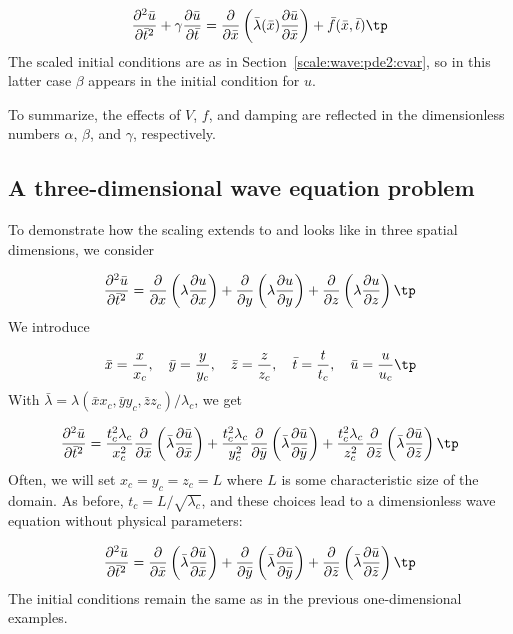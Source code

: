 \documentclass[graybox,envcountchap,sectrefs,final]{svmonodo}
\begin{document}
\begin{equation}
\frac{\partial^2 \bar u}{\partial \bar t^2}
+ \gamma\frac{\partial \bar u}{\partial \bar t} =
\frac{\partial}{\partial \bar x}\left(
\bar \lambda(\bar x) {\partial\bar u\over\partial\bar x}\right) +
\bar f(\bar x,\bar t)\tp
\end{equation}
The scaled initial conditions are as in
Section~\ref{scale:wave:pde2:cvar}, so in this latter case
$\beta$ appears in the initial condition for $u$.

To summarize, the effects of $V$, $f$, and damping are reflected in
the dimensionless numbers $\alpha$, $\beta$, and $\gamma$,
respectively.

\subsection{A three-dimensional wave equation problem}

To demonstrate how the scaling extends to and looks like in
three spatial dimensions, we consider

\begin{equation}
\frac{\partial^2 \bar u}{\partial \bar t^2} =
\frac{\partial}{\partial x}\left(\lambda\frac{\partial u}{\partial x}\right)+
\frac{\partial}{\partial y}\left(\lambda\frac{\partial u}{\partial y}\right)+
\frac{\partial}{\partial z}\left(\lambda\frac{\partial u}{\partial z}\right)\tp
\end{equation}
We introduce

\[ \bar x = \frac{x}{x_c},\quad \bar y = \frac{y}{y_c},
   \quad \bar z = \frac{z}{z_c},
   \quad \bar t = \frac{t}{t_c}, \quad \bar u =\frac{u}{u_c}\tp\]
With $\bar\lambda = \lambda(\bar xx_c, \bar y y_c, \bar z z_c)/\lambda_c$,
we get

\[
\frac{\partial^2 \bar u}{\partial \bar t^2} =
\frac{t_c^2\lambda_c}{x_c^2}\frac{\partial}{\partial \bar x}\left(\bar\lambda\frac{\partial \bar u}{\partial \bar x}\right)+
\frac{t_c^2\lambda_c}{y_c^2}\frac{\partial}{\partial \bar y}\left(\bar\lambda\frac{\partial \bar u}{\partial \bar y}\right)+
\frac{t_c^2\lambda_c}{z_c^2}\frac{\partial}{\partial \bar z}\left(\bar\lambda\frac{\partial \bar u}{\partial \bar z}\right)\tp
\]
Often, we will set $x_c=y_c=z_c=L$ where $L$ is some characteristic
size of the domain.
As before, $t_c = L/\sqrt{\lambda_c}$, and these choices lead to a
dimensionless wave equation without physical parameters:

\begin{equation}
\frac{\partial^2 \bar u}{\partial \bar t^2} =
\frac{\partial}{\partial \bar x}\left(\bar\lambda\frac{\partial \bar u}{\partial \bar x}\right)+
\frac{\partial}{\partial \bar y}\left(\bar\lambda\frac{\partial \bar u}{\partial \bar y}\right)+
\frac{\partial}{\partial \bar z}\left(\bar\lambda\frac{\partial \bar u}{\partial \bar z}\right)\tp
\end{equation}
The initial conditions remain the same as in the previous one-dimensional
examples.
\end{document}

